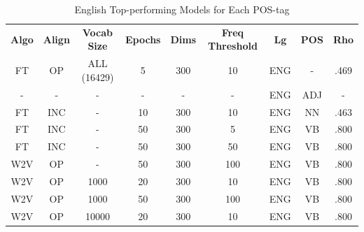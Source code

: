 \begin{table}[h]
\centering
\begin{tabular}{ccccccccc} 
\toprule
\textbf{ Algo } & \textbf{ Align } & \textbf{ Vocab Size } & \textbf{ Epochs } & \textbf{ Dims } & \textbf{ Freq Threshold } & \textbf{ Lg } & \textbf{ POS } & \textbf{ Rho }  \\
FT              & OP               & ALL (16429)           & 5                 & 300             & 10                        & ENG           & -              & .469            \\
-               & -                & -                     & -                 & -               & -                         & ENG           & ADJ            & -               \\
FT              & INC              & -                     & 10                & 300             & 10                        & ENG           & NN             & .463            \\
FT              & INC              & -                     & 50                & 300             & 5                         & ENG           & VB             & .800            \\
FT              & INC              & -                     & 50                & 300             & 50                        & ENG           & VB             & .800            \\
W2V             & OP               & -                     & 50                & 300             & 100                       & ENG           & VB             & .800            \\
W2V             & OP               & 1000                  & 20                & 300             & 10                        & ENG           & VB             & .800            \\
W2V             & OP               & 1000                  & 50                & 300             & 100                       & ENG           & VB             & .800            \\
W2V             & OP               & 10000                 & 20                & 300             & 10                        & ENG           & VB             & .800            \\
\bottomrule
\end{tabular}
\caption{English Top-performing Models for Each POS-tag}
\label{tab:eng-posresults}
\end{table}


